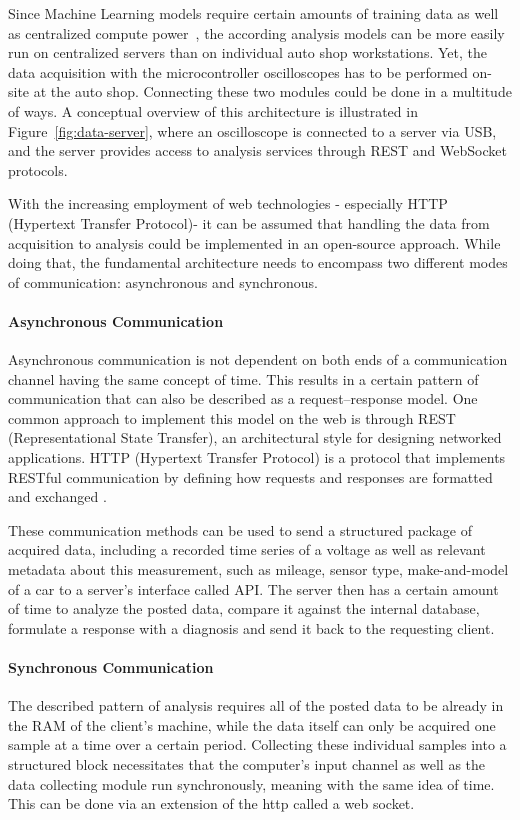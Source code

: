 Since Machine Learning models require certain amounts of training data as well as centralized compute power~\cite{Verbraeken2020DMLS}, 
the according analysis models can be more easily run on centralized servers than on individual auto shop workstations. 
Yet, the data acquisition with the microcontroller oscilloscopes has to be performed on-site at the auto shop. 
Connecting these two modules could be done in a multitude of ways. 
A conceptual overview of this architecture is illustrated in Figure~\ref{fig:data-server}, where an oscilloscope is connected to a server via USB, 
and the server provides access to analysis services through REST and WebSocket protocols.

With the increasing employment of web technologies - especially HTTP (Hypertext Transfer Protocol)- it can be assumed that handling the data from acquisition to analysis could be implemented in an open-source approach. 
While doing that, the fundamental architecture needs to encompass two different modes of communication: asynchronous and synchronous.

\paragraph{Asynchronous Communication}
Asynchronous communication is not dependent on both ends of a communication channel having the same concept of time. 
This results in a certain pattern of communication that can also be described as a request–response model. 
One common approach to implement this model on the web is through REST (Representational State Transfer), an architectural style for designing networked applications. 
HTTP (Hypertext Transfer Protocol) is a protocol that implements RESTful communication by defining how requests and responses are formatted and exchanged \cite{Fielding2000}.

These communication methods can be used to send a structured package of acquired data, including a recorded time series of a voltage as well as relevant metadata about this measurement, 
such as mileage, sensor type, make-and-model of a car to a server’s interface called API. 
The server then has a certain amount of time to analyze the posted data, compare it against the internal database, formulate a response with a diagnosis and send it back to the requesting client.

\paragraph{Synchronous Communication}
The described pattern of analysis requires all of the posted data to be already in the RAM of the client’s machine, while the data itself can only be acquired one sample at a time over a certain period. 
Collecting these individual samples into a structured block necessitates that the computer’s input channel as well as the data collecting module run synchronously, meaning with the same idea of time. 
This can be done via an extension of the http called a web socket.

